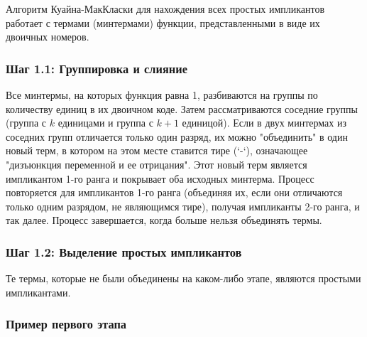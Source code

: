 \documentclass[12pt,letterpaper]{article}
\begin{document}
Алгоритм Куайна-МакКласки для нахождения всех простых импликантов работает с термами (минтермами) функции, представленными в виде их двоичных номеров.

\subsubsection{Шаг 1.1: Группировка и слияние}

Все минтермы, на которых функция равна 1, разбиваются на группы по количеству единиц в их двоичном коде. Затем рассматриваются соседние группы (группа с \(k\) единицами и группа с \(k + 1\) единицой). Если в двух минтермах из соседних групп отличается только один разряд, их можно "объединить" в один новый терм, в котором на этом месте ставится тире (`-`), означающее "дизъюнкция переменной и ее отрицания". Этот новый терм является импликантом 1-го ранга и покрывает оба исходных минтерма. Процесс повторяется для импликантов 1-го ранга (объединяя их, если они отличаются только одним разрядом, не являющимся тире), получая импликанты 2-го ранга, и так далее. Процесс завершается, когда больше нельзя объединять термы.

\subsubsection{Шаг 1.2: Выделение простых импликантов}

Те термы, которые не были объединены на каком-либо этапе, являются простыми импликантами.

\subsubsection{Пример первого этапа}
\end{document}
